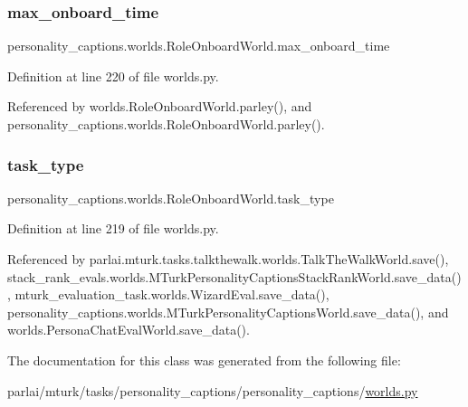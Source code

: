 \mbox{\label{classpersonality__captions_1_1worlds_1_1RoleOnboardWorld_aa6108733e26c2d1761e8155a65c2df12}} 
\subsubsection{\texorpdfstring{max\+\_\+onboard\+\_\+time}{max\_onboard\_time}}
{\footnotesize\ttfamily personality\+\_\+captions.\+worlds.\+Role\+Onboard\+World.\+max\+\_\+onboard\+\_\+time}



Definition at line 220 of file worlds.\+py.



Referenced by worlds.\+Role\+Onboard\+World.\+parley(), and personality\+\_\+captions.\+worlds.\+Role\+Onboard\+World.\+parley().

\mbox{\label{classpersonality__captions_1_1worlds_1_1RoleOnboardWorld_a6cf6206af24cf6a9402f23f620d4e365}} 
\subsubsection{\texorpdfstring{task\+\_\+type}{task\_type}}
{\footnotesize\ttfamily personality\+\_\+captions.\+worlds.\+Role\+Onboard\+World.\+task\+\_\+type}



Definition at line 219 of file worlds.\+py.



Referenced by parlai.\+mturk.\+tasks.\+talkthewalk.\+worlds.\+Talk\+The\+Walk\+World.\+save(), stack\+\_\+rank\+\_\+evals.\+worlds.\+M\+Turk\+Personality\+Captions\+Stack\+Rank\+World.\+save\+\_\+data(), mturk\+\_\+evaluation\+\_\+task.\+worlds.\+Wizard\+Eval.\+save\+\_\+data(), personality\+\_\+captions.\+worlds.\+M\+Turk\+Personality\+Captions\+World.\+save\+\_\+data(), and worlds.\+Persona\+Chat\+Eval\+World.\+save\+\_\+data().



The documentation for this class was generated from the following file\+:\begin{DoxyCompactItemize}
\item 
parlai/mturk/tasks/personality\+\_\+captions/personality\+\_\+captions/\hyperlink{parlai_2mturk_2tasks_2personality__captions_2personality__captions_2worlds_8py}{worlds.\+py}\end{DoxyCompactItemize}
